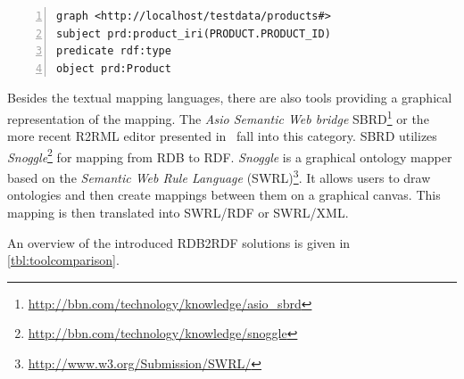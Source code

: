 
\begin{lstlisting}[label=lst:lst4, style=rdf,numbers=left, numberstyle=\tiny, caption = Virtuoso RDF views example]
graph <http://localhost/testdata/products#>
subject prd:product_iri(PRODUCT.PRODUCT_ID)
predicate rdf:type
object prd:Product
  \end{lstlisting}


Besides the textual mapping languages, there are also tools providing a graphical representation of the mapping.
The \emph{Asio Semantic Web bridge} SBRD\footnote{\url{http://bbn.com/technology/knowledge/asio_sbrd}} or the more recent R2RML editor presented in~\cite{r2rmleditor} fall into this category.
SBRD utilizes \emph{Snoggle}\footnote{\url{http://bbn.com/technology/knowledge/snoggle}} for mapping from RDB to RDF.
\emph{Snoggle} is a graphical ontology mapper based on the \emph{Semantic Web Rule Language} (SWRL)\footnote{\url{http://www.w3.org/Submission/SWRL/}}.
It allows users to draw ontologies and then create mappings between them on a graphical canvas.
This mapping is then translated into SWRL/RDF or SWRL/XML.

An overview of the introduced RDB2RDF solutions is given in \autoref{tbl:toolcomparison}.



